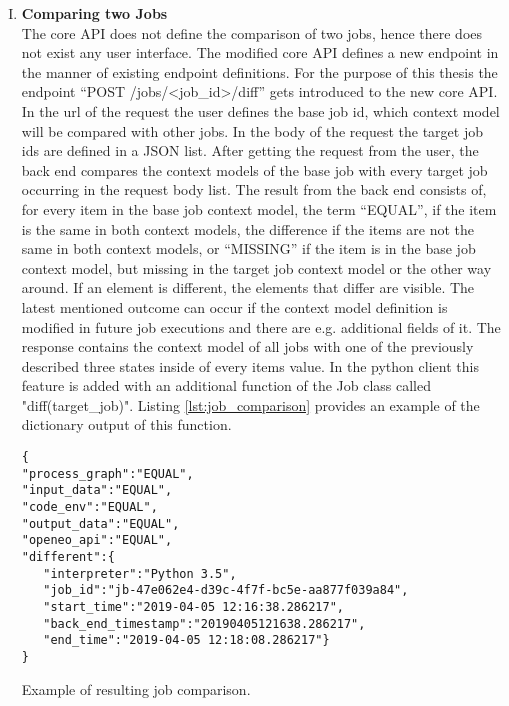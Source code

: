 \documentclass[draft,final]{vutinfth} %
\begin{document}
\begin{enumerate}[I.]
\item \textbf{Comparing two Jobs} \\
	The core API does not define the comparison of two jobs, hence there does not exist any user interface. The modified core API defines a new endpoint in the manner of existing endpoint definitions. For the purpose of this thesis the endpoint  “POST /jobs/<job\_id>/diff” gets introduced to the new core API. In the url of the request the user defines the base job id, which context model will be compared with other jobs. In the body of the request the target job ids are defined in a JSON list. After getting the request from the user, the back end compares the context models of the base job with every target job occurring in the request body list. The result from the back end consists of, for every item in the base job context model, the term “EQUAL”, if the item is the same in both context models, the difference if the items are not the same in both context models, or “MISSING” if the item is in the base job context model, but missing in the target job context model or the other way around. If an element is different, the elements that differ are visible. The latest mentioned outcome can occur if the context model definition is modified in future job executions and there are e.g. additional fields of it. The response contains the context model of all jobs with one of the previously described three states inside of every items value. In the python client this feature is added with an additional function of the Job class called "diff(target\_job)". Listing \ref{lst:job_comparison} provides an example of the dictionary output of this function.

\begin{listing}[ht]
	\begin{verbatim}
{
"process_graph":"EQUAL",
"input_data":"EQUAL",
"code_env":"EQUAL",
"output_data":"EQUAL",
"openeo_api":"EQUAL",
"different":{
   "interpreter":"Python 3.5",
   "job_id":"jb-47e062e4-d39c-4f7f-bc5e-aa877f039a84",
   "start_time":"2019-04-05 12:16:38.286217",
   "back_end_timestamp":"20190405121638.286217",
   "end_time":"2019-04-05 12:18:08.286217"}
}
	\end{verbatim}
	\caption{Example of resulting job comparison.}
	\label{lst:job_comparison}
\end{listing}	



\end{enumerate}
\end{document}
